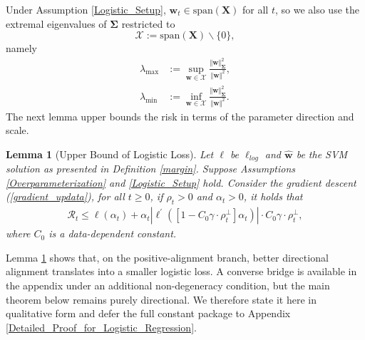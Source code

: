 \documentclass[pdflatex,sn-basic]{sn-jnl}%
\theoremstyle{thmstyleone}%
\newtheorem{lemma}[theorem]{Lemma}
\begin{document}
Under Assumption \ref{Logistic_Setup}, $\mathbf{w}_t \in \text{span}(\mathbf{X})$ for all $t$, so we also use the extremal eigenvalues of $\mathbf{\Sigma}$ restricted to
\[
  \mathcal{X} := \text{span}(\mathbf{X}) \backslash \{0\},
\]
namely
\begin{equation*}
\begin{aligned}
  \lambda_{\max}
  &:=
  \sup_{\mathbf{w} \in \mathcal{X}}
  \frac{\Vert \mathbf{w} \Vert_{\mathbf{\Sigma}}^2}{\Vert \mathbf{w} \Vert^2},
  \\
  \lambda_{\min}
  &:=
  \inf_{\mathbf{w} \in \mathcal{X}}
  \frac{\Vert \mathbf{w} \Vert_{\mathbf{\Sigma}}^2}{\Vert \mathbf{w} \Vert^2}.
\end{aligned}
\end{equation*}
The next lemma upper bounds the risk in terms of the parameter direction and scale.
\begin{lemma}[Upper Bound of Logistic Loss]\label{risk_upperbound_logit_reg}
  Let $\ell$ be $\ell_{log}$ and $\hat{\mathbf{w}}$ be the SVM solution as presented in Definition \ref{margin}. 
  Suppose Assumptions \ref{Overparameterization} and \ref{Logistic_Setup} hold.
  Consider the gradient descent (\ref{gradient_updata}), 
  for all $t \ge 0$, if $\rho_t > 0$ and $\alpha_t > 0$, it holds that 
  \begin{equation*}
  \begin{aligned}
    \mathcal{R}_t \le 
    \ell \left(\alpha_t\right) +
    \alpha_t \left| \ell^{\prime} \left(
        \left[ 1 -  C_0 \gamma \cdot \rho_t^{\perp} \right] \alpha_t
      \right)
    \right|
    \cdot C_0 \gamma \cdot \rho_t^{\perp},
  \end{aligned}
  \end{equation*}
  where $C_0$ is a data-dependent constant. 
\end{lemma}
Lemma \ref{risk_upperbound_logit_reg} shows that, on the positive-alignment branch, better directional alignment translates into a smaller logistic loss. A converse bridge is available in the appendix under an additional non-degeneracy condition, but the main theorem below remains purely directional. We therefore state it here in qualitative form and defer the full constant package to Appendix \ref{Detailed_Proof_for_Logistic_Regression}.
\end{document}
